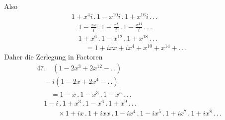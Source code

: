Also
\[
\begin{gathered}
1+x^4i\,.\,1-x^{10}i\,.\,1+x^{16}i\,.\,.\,.\,
\\[8pt]\quad{}1-\frac{xx}{i}\,.\,1+\frac{x^8}{i}\,.\,1-\frac{x^{14}}{i}\,.\,.\,.\,\\[8pt]\quad{}
1+x^6\,.\,1-x^{12}\,.\,1+x^{18}\,.\,.\,.\\[8pt]
\qquad=1+ixx+ix^4+x^{10}+x^{14}+ .\,.\,.
\end{gathered}
\]
Daher die Zerlegung in Factoren
\[
\begin{gathered}
47.\quad (1-2x^3+2x^{12}- .\,.)\\[8pt]\quad{}-i(1-2x+2x^4- .\,.)\\[8pt]
\qquad=1-x\,.\,1-x^3\,.\,1-x^5\,.\,.\,.\,\\[8pt]\quad{}
1-i\,.\,1+x^3\,.\,1-x^6\,.\,1+x^9\,.\,.\,.\\[8pt]
\qquad\quad\times1+ix\,.\,1+ixx\,.\,1-ix^4\,.\,1-ix^5\,.\,1+ix^7\,.\,1+ix^8\,.\,.\,.
\end{gathered}
\]
